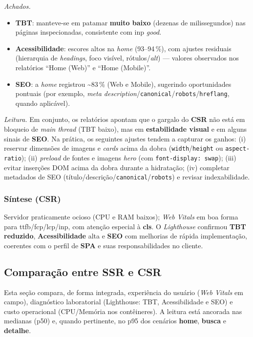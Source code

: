 \noindent \textit{Achados.}
\begin{itemize}
  \item \textbf{TBT}: manteve-se em patamar \textbf{muito baixo} (dezenas de milissegundos) nas páginas inspecionadas, consistente com \acrshort{inp} \textit{good}.
  \item \textbf{Acessibilidade}: escores altos na \emph{home} (93--94\,\%), com ajustes residuais (hierarquia de \emph{headings}, foco visível, rótulos/\textit{alt}) — valores observados nos relatórios “Home (Web)” e “Home (Mobile)”.
  \item \textbf{SEO}: a \emph{home} registrou \textasciitilde{}83\,\% (Web e Mobile), sugerindo oportunidades pontuais (por exemplo, \emph{meta description}/\texttt{canonical}/\texttt{robots}/\texttt{hreflang}, quando aplicável).
\end{itemize}

\noindent \textit{Leitura.} Em conjunto, os relatórios apontam que o gargalo do \textbf{CSR} não está em bloqueio de \emph{main thread} (TBT baixo), mas em \textbf{estabilidade visual} e em alguns sinais de \textbf{SEO}. Na prática, os seguintes ajustes tendem a capturar os ganhos: (i) reservar dimensões de imagens e \emph{cards} acima da dobra (\texttt{width}/\texttt{height} ou \texttt{aspect-ratio}); (ii) \emph{preload} de fontes e imagens \emph{hero} (com \texttt{font-display: swap}); (iii) evitar inserções DOM acima da dobra durante a hidratação; (iv) completar metadados de SEO (título/descrição/\texttt{canonical}/\texttt{robots}) e revisar indexabilidade.

\subsubsection*{Síntese (CSR)}
Servidor praticamente ocioso (CPU e RAM baixos); \emph{Web Vitals} em boa forma para \acrshort{ttfb}/\acrshort{fcp}/\acrshort{lcp}/\acrshort{inp}, com atenção especial à \textbf{\acrshort{cls}}. O \emph{Lighthouse} confirmou \textbf{TBT reduzido}, \textbf{Acessibilidade} alta e \textbf{SEO} com melhorias de rápida implementação, coerentes com o perfil de \textbf{SPA} e suas responsabilidades no cliente.

\subsection{Comparação entre SSR e CSR}
\label{subsec:comparacao-ssr-csr}

Esta seção compara, de forma integrada, experiência do usuário (\emph{Web Vitals} em campo), diagnóstico laboratorial (Lighthouse: TBT, Acessibilidade e SEO) e custo operacional (CPU/Memória nos contêineres). A leitura está ancorada nas medianas (p50) e, quando pertinente, no p95 dos cenários \textbf{home}, \textbf{busca} e \textbf{detalhe}.

